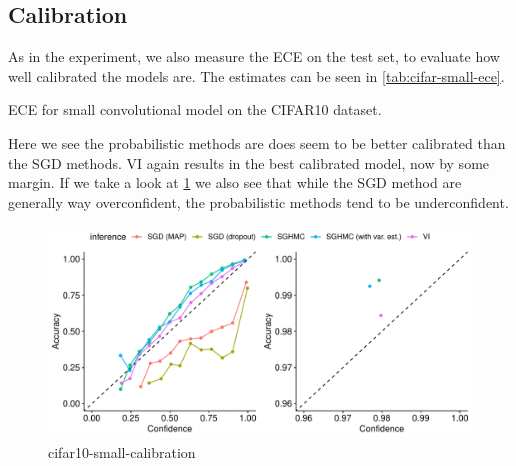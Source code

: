 \subsection{Calibration}
As in the experiment, we also measure the ECE on the test set, to evaluate how well calibrated the models are.
The estimates can be seen in \cref{tab:cifar-small-ece}.
\begin{table}[htbp]
    \centering
    
    \caption{ECE for small convolutional model on the CIFAR10 dataset.}
    \label{tab:cifar-small-ece}
\end{table}
Here we see the probabilistic methods are does seem to be better calibrated than the SGD methods.
VI again results in the best calibrated model, now by some margin.
If we take a look at \cref{fig:cifar-small-calibration} we also see that while the SGD method are generally way overconfident, the probabilistic methods tend to be underconfident.
\begin{figure}[htbp]
    \centering
    \includegraphics[width=\linewidth]{Figures/cifar10-small-calibration.pdf}
    \caption{cifar10-small-calibration}
    \label{fig:cifar-small-calibration}
\end{figure}
